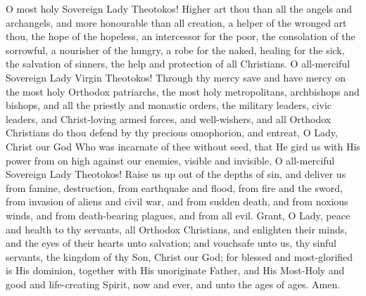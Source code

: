 \pagebreak

\begin{center}
  {\color{Maroon}{\large Prayer Following Akathist}}
\end{center}

\Priest O most holy Sovereign Lady Theotokos! Higher art thou than all the angels and archangels, and more honourable than all creation, a helper of the wronged art thou, the hope of the hopeless, an intercessor for the poor, the consolation of the sorrowful, a nourisher of the hungry, a robe for the naked, healing for the sick, the salvation of sinners, the help and protection of all Christians. O all-merciful Sovereign Lady Virgin Theotokos! Through thy mercy save and have mercy on the most holy Orthodox patriarchs, the most holy metropolitans, archbishops and bishops, and all the priestly and monastic orders, the military leaders, civic leaders, and Christ-loving armed forces, and well-wishers, and all Orthodox Christians do thou defend by thy precious omophorion, and entreat, O Lady, Christ our God Who was incarnate of thee without seed, that He gird us with His power from on high against our enemies, visible and invisible, O all-merciful Sovereign Lady Theotokos! Raise us up out of the depths of sin, and deliver us from famine, destruction, from earthquake and flood, from fire and the sword, from invasion of aliens and civil war, and from sudden death, and from noxious winds, and from death-bearing plagues, and from all evil. Grant, O Lady, peace and health to thy servants, all Orthodox Christians, and enlighten their minds, and the eyes of their hearts unto salvation; and vouchsafe unto us, thy sinful servants, the kingdom of thy Son, Christ our God; for blessed and most-glorified is His dominion, together with His unoriginate Father, and His Most-Holy and good and life-creating Spirit, now and ever, and unto the ages of ages. Amen.

\pagebreak

